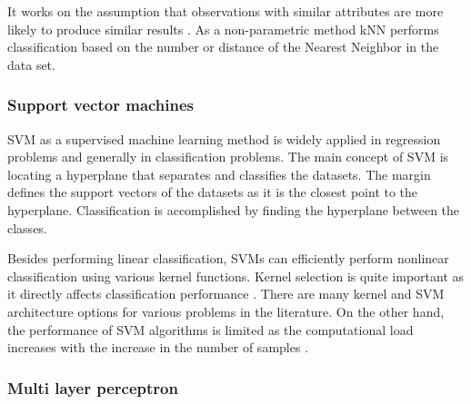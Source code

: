 It works on the assumption that observations with similar attributes are more likely to produce similar results \cite{richman2011multivariate}. As a non-parametric method kNN performs classification based on the number or distance of the Nearest Neighbor in the data set.

\subsubsection{Support vector machines}

SVM as a supervised machine learning method is widely applied in regression problems and generally in classification problems. The main concept of SVM is locating a hyperplane that separates and classifies the datasets. The margin defines the support vectors of the datasets as it is the closest point to the hyperplane. Classification is accomplished by finding the hyperplane between the classes.

Besides performing linear classification, SVMs can efficiently perform nonlinear classification using various kernel functions. Kernel selection is quite important as it directly affects classification performance \cite{liu2018artificial}. There are many kernel and SVM architecture options for various problems in the literature. On the other hand, the performance of SVM algorithms is limited as the computational load increases with the increase in the number of samples \cite{haykin2010neural}. 

\subsubsection{Multi layer perceptron}

